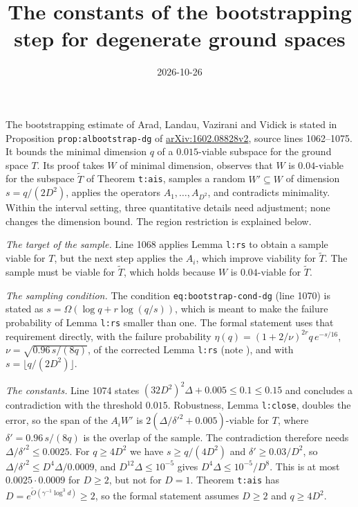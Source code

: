 \documentclass{article}
\title{The constants of the bootstrapping step for degenerate ground spaces}
\author{}
\date{2026-10-26}
\begin{document}
\maketitle
{}

The bootstrapping estimate of Arad, Landau, Vazirani and Vidick is stated in
Proposition \texttt{prop:albootstrap-dg} of
\href{https://arxiv.org/abs/1602.08828}{arXiv:1602.08828v2}, source lines
1062--1075. It bounds the minimal dimension $q$ of a $0.015$-viable subspace for
the ground space $T$. Its proof takes $W$ of minimal dimension, observes that
$W$ is $0.04$-viable for the subspace $\tilde T$ of Theorem \texttt{t:ais},
samples a random $W'\subseteq W$ of dimension $s=q/(2D^2)$, applies the
operators $A_1,\dots,A_{D^2}$, and contradicts minimality. Within the interval
setting, three quantitative details need adjustment; none changes the dimension
bound. The region restriction is explained below.

\emph{The target of the sample.} Line 1068 applies Lemma \texttt{l:rs} to
obtain a sample viable for $T$, but the next step applies the $A_i$, which
improve viability for $\tilde T$. The sample must be viable for $\tilde T$,
which holds because $W$ is $0.04$-viable for $\tilde T$.

\emph{The sampling condition.} The condition
\texttt{eq:bootstrap-cond-dg} (line 1070) is stated as
$s=\Omega(\log q+r\log(q/s))$, which is meant to make the failure probability
of Lemma \texttt{l:rs} smaller than one. The formal statement uses that
requirement directly, with the failure probability
$\eta(q)=(1+2/\nu)^{2r}q\,e^{-s/16}$, $\nu=\sqrt{0.96\,s/(8q)}$, of the
corrected Lemma \texttt{l:rs} (note ),
and with $s=\lfloor q/(2D^2)\rfloor$.

\emph{The constants.} Line 1074 states $(32D^2)^2\Delta+0.005\le0.1\le0.15$
and concludes a contradiction with the threshold $0.015$. Robustness,
Lemma \texttt{l:close}, doubles the error, so the span of the $A_iW'$ is
$2(\Delta/\delta'^2+0.005)$-viable for $T$, where $\delta'=0.96\,s/(8q)$ is the
overlap of the sample. The contradiction therefore needs
$\Delta/\delta'^2\le0.0025$. For $q\ge4D^2$ we have $s\ge q/(4D^2)$ and
$\delta'\ge0.03/D^2$, so $\Delta/\delta'^2\le D^4\Delta/0.0009$, and
$D^{12}\Delta\le10^{-5}$ gives $D^4\Delta\le10^{-5}/D^8$. This is at most
$0.0025\cdot0.0009$ for $D\ge2$, but not for $D=1$. Theorem \texttt{t:ais}
has $D=e^{\tilde O(\gamma^{-1}\log^3d)}\ge2$, so the formal statement assumes
$D\ge2$ and $q\ge4D^2$.
\end{document}
